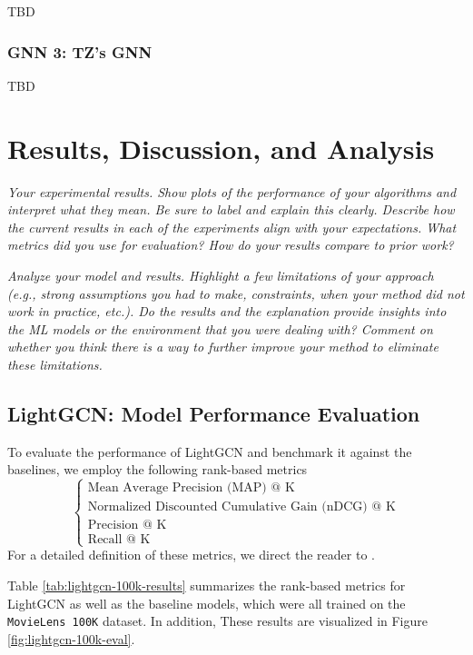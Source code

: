 \documentclass{article}
\begin{document}
TBD

\subsubsection{GNN 3: TZ's GNN}

TBD

\section{Results, Discussion, and Analysis} \label{results}

\textit{Your experimental results. Show plots of the performance of your algorithms and interpret what they mean. Be sure to label and explain this clearly. Describe how the current results in each of the experiments align with your expectations. What metrics did you use for evaluation? How do your results compare to prior work?}

\textit{Analyze your model and results. Highlight a few limitations of your approach (e.g., strong assumptions you had to make, constraints, when your method did not work in practice, etc.). Do
the results and the explanation provide insights into the ML models or the environment that you were dealing with? Comment on whether you think there is a way to further improve your method to eliminate these limitations.}

\subsection{LightGCN: Model Performance Evaluation} \label{lightgcn-eval}

To evaluate the performance of LightGCN and benchmark it against the baselines, we employ the following rank-based metrics
$$
\begin{cases}
\text{Mean Average Precision (MAP) @ K} \\
\text{Normalized Discounted Cumulative Gain (nDCG) @ K} \\
\text{Precision @ K} \\
\text{Recall @ K}
\end{cases}
$$
For a detailed definition of these metrics, we direct the reader to \cite{metrics}.

Table \ref{tab:lightgcn-100k-results} summarizes the rank-based metrics for LightGCN as well as the baseline models, which were all trained on the \texttt{MovieLens 100K} dataset. In addition, These results are visualized in Figure \ref{fig:lightgcn-100k-eval}.
\end{document}
